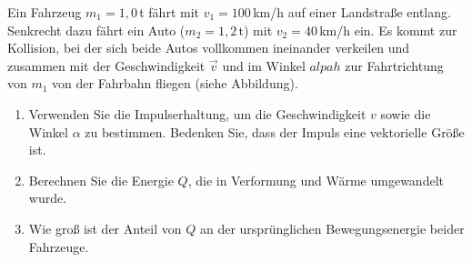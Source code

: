 \begin{ExerciseBlock}
Ein Fahrzeug $m_1 = 1,0$\,t fährt mit $v_1 = 100\,$km/h auf einer Landstraße entlang. Senkrecht dazu fährt ein Auto ($m_2 = 1,2\,$t) mit $v_2 = 40\,$km/h ein. Es kommt zur Kollision, bei der sich beide Autos vollkommen ineinander verkeilen und zusammen mit der Geschwindigkeit $\vec{v}$ und im Winkel $alpah$ zur Fahrtrichtung von $m_1$ von der Fahrbahn fliegen (siehe Abbildung).

\begin{center}
\end{center}

\begin{enumerate}
	\item Verwenden Sie die Impulserhaltung, um die Geschwindigkeit $v$ sowie die Winkel $\alpha$ zu bestimmen. Bedenken Sie, dass der Impuls eine vektorielle Größe ist.

	\item Berechnen Sie die Energie $Q$, die in Verformung und Wärme umgewandelt wurde.

	\item Wie groß ist der Anteil von $Q$ an der ursprünglichen Bewegungsenergie beider Fahrzeuge.

\end{enumerate}
\end{ExerciseBlock}
